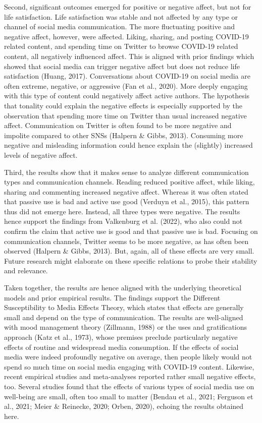 \documentclass[
  man,mask,floatsintext]{apa7}
\begin{document}
Second, significant outcomes emerged for positive or negative affect, but not for life satisfaction.
Life satisfaction was stable and not affected by any type or channel of social media communication.
The more fluctuating positive and negative affect, however, were affected.
Liking, sharing, and posting COVID-19 related content, and spending time on Twitter to browse COVID-19 related content, all negatively influenced affect.
This is aligned with prior findings which showed that social media can trigger negative affect but does not reduce life satisfaction (Huang, 2017).
Conversations about COVID-19 on social media are often extreme, negative, or aggressive (Fan et al., 2020).
More deeply engaging with this type of content could negatively affect active authors.
The hypothesis that tonality could explain the negative effects is especially supported by the observation that spending more time on Twitter than usual increased negative affect.
Communication on Twitter is often found to be more negative and impolite compared to other SNSs (Halpern \& Gibbs, 2013).
Consuming more negative and misleading information could hence explain the (slightly) increased levels of negative affect.

Third, the results show that it makes sense to analyze different communication types and communication channels.
Reading reduced positive affect, while liking, sharing and commenting increased negative affect.
Whereas it was often stated that passive use is bad and active use good (Verduyn et al., 2015), this pattern thus did not emerge here.
Instead, all three types were negative.
The results hence support the findings from Valkenburg et al. (2022), who also could not confirm the claim that active use is good and that passive use is bad.
Focusing on communication channels, Twitter seems to be more negative, as has often been observed (Halpern \& Gibbs, 2013).
But, again, all of these effects are very small.
Future research might elaborate on these specific relations to probe their stability and relevance.

Taken together, the results are hence aligned with the underlying theoretical models and prior empirical results.
The findings support the Different Susceptibility to Media Effects Theory, which states that effects are generally small and depend on the type of communication.
The results are well-aligned with mood management theory (Zillmann, 1988) or the uses and gratifications approach (Katz et al., 1973), whose premises preclude particularly negative effects of routine and widespread media consumption.
If the effects of social media were indeed profoundly negative on average, then people likely would not spend so much time on social media engaging with COVID-19 content.
Likewise, recent empirical studies and meta-analyses reported rather small negative effects, too.
Several studies found that the effects of various types of social media use on well-being are small, often too small to matter (Bendau et al., 2021; Ferguson et al., 2021; Meier \& Reinecke, 2020; Orben, 2020), echoing the results obtained here.
\end{document}
